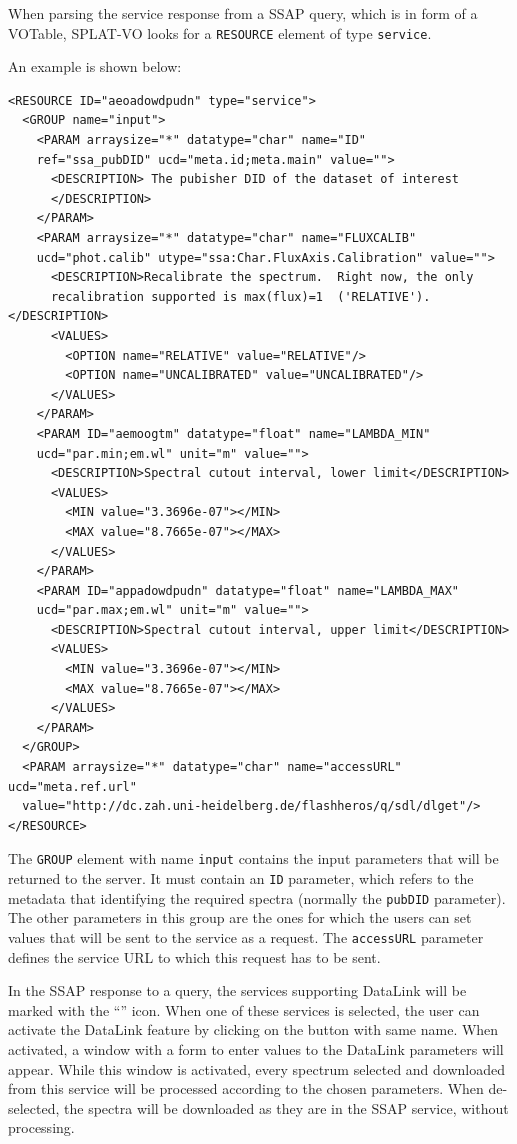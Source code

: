 \documentclass[final,authoryear,5p,times,twocolumn]{elsarticle}
\begin{document}
When parsing the service response from a SSAP query, which is in form
of a VOTable, SPLAT-VO looks for a \texttt{RESOURCE} element of type \texttt{service}.

An example is shown below:

{\tiny
\begin{minipage}{\textwidth}
\begin{verbatim}
<RESOURCE ID="aeoadowdpudn" type="service">
  <GROUP name="input">
    <PARAM arraysize="*" datatype="char" name="ID"
    ref="ssa_pubDID" ucd="meta.id;meta.main" value="">
      <DESCRIPTION> The pubisher DID of the dataset of interest
      </DESCRIPTION>
    </PARAM>
    <PARAM arraysize="*" datatype="char" name="FLUXCALIB"
    ucd="phot.calib" utype="ssa:Char.FluxAxis.Calibration" value="">
      <DESCRIPTION>Recalibrate the spectrum.  Right now, the only
      recalibration supported is max(flux)=1  ('RELATIVE').</DESCRIPTION>
      <VALUES>
        <OPTION name="RELATIVE" value="RELATIVE"/>
        <OPTION name="UNCALIBRATED" value="UNCALIBRATED"/>
      </VALUES>
    </PARAM>
    <PARAM ID="aemoogtm" datatype="float" name="LAMBDA_MIN"
    ucd="par.min;em.wl" unit="m" value="">
      <DESCRIPTION>Spectral cutout interval, lower limit</DESCRIPTION>
      <VALUES>
        <MIN value="3.3696e-07"></MIN>
        <MAX value="8.7665e-07"></MAX>
      </VALUES>
    </PARAM>
    <PARAM ID="appadowdpudn" datatype="float" name="LAMBDA_MAX"
    ucd="par.max;em.wl" unit="m" value="">
      <DESCRIPTION>Spectral cutout interval, upper limit</DESCRIPTION>
      <VALUES>
        <MIN value="3.3696e-07"></MIN>
        <MAX value="8.7665e-07"></MAX>
      </VALUES>
    </PARAM>
  </GROUP>
  <PARAM arraysize="*" datatype="char" name="accessURL" ucd="meta.ref.url"
  value="http://dc.zah.uni-heidelberg.de/flashheros/q/sdl/dlget"/>
</RESOURCE>
\end{verbatim}

\end{minipage}
}

The \texttt{GROUP} element with name \texttt{input} contains the input
parameters that will be returned to the server.  It must contain an \texttt{ID}
parameter, which refers to the metadata that identifying the required
spectra (normally the \texttt{pubDID} parameter).  The other parameters in
this group are the ones for which the users can set values that will
be sent to the service as a request. The \texttt{accessURL} parameter defines
the service URL to which this request has to be sent.

In the SSAP response to a query, the services supporting DataLink will
be marked with the  ``''  icon. When one of these services is
selected, the user can activate the DataLink feature by clicking on
the button with same name. When activated, a window with a form to
enter values to the DataLink parameters will appear. While this window
is activated, every spectrum selected and downloaded from this service
will be processed according to the chosen parameters. When
de-selected, the spectra will be downloaded as they are in the SSAP
service, without processing.
\end{document}
